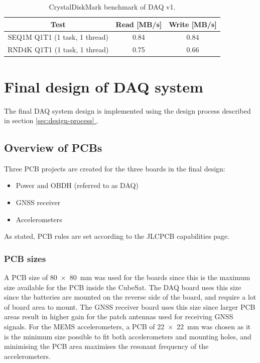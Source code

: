 \documentclass[draft]{report}
\newcommand*{\secref}[1]{section \hyperref[{#1}]{\ref*{#1} \nameref*{#1}}}
\begin{document}
\begin{table}[H]
  \centering
  \begin{tabular}{|c|c|c|}
    Test                          & Read [MB/s] & Write [MB/s] \\
    \hline
    SEQ1M Q1T1 (1 task, 1 thread) & 0.84        & 0.84         \\
    RND4K Q1T1 (1 task, 1 thread) & 0.75        & 0.66         \\
  \end{tabular}
  \caption{CrystalDiskMark benchmark of DAQ v1.}
  \label{tabl:daq-v1-diskmark}
\end{table}

\chapter{Final design of DAQ system}

The final DAQ system design is implemented using the design process described in \secref{sec:design-process}.

\section{Overview of PCBs}

Three PCB projects are created for the three boards in the final design:
\begin{itemize}
  \item Power and OBDH (referred to as DAQ)
  \item GNSS receiver
  \item Accelerometers
\end{itemize}

As stated, PCB rules are set according to the JLCPCB capabilities page.

\subsection{PCB sizes}
A PCB size of \SI{80 x 80}{\milli\metre} was used for the  boards since this is the maximum size available for the PCB inside the CubeSat. The DAQ board uses this size since the batteries are mounted on the reverse side of the board, and require a lot of board area to mount. The GNSS receiver board uses this size since larger PCB areas result in higher gain for the patch antennas used for receiving GNSS signals. For the MEMS accelerometers, a PCB of \SI{22 x 22}{\milli\metre} was chosen as it is the minimum size possible to fit both accelerometers and mounting holes, and minimising the PCB area maximises the resonant frequency of the accelerometers.
\end{document}
